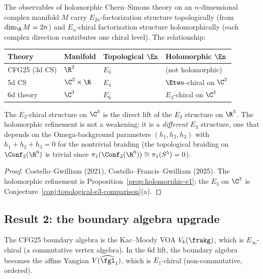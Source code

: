 \begin{proposition}
\label{prop:holomorphic-en-refinement}
The observables of holomorphic Chern--Simons theory on an $n$-dimensional complex manifold $M$ carry $E_{2n}$-factorization structure topologically (from $\dim_\R M = 2n$) and $E_n$-chiral factorization structure holomorphically (each complex direction contributes one chiral level). The relationship:
\begin{center}
\renewcommand{\arraystretch}{1.2}
\small
\begin{tabular}{llll}
 \toprule
 \textbf{Theory} & \textbf{Manifold} & \textbf{Topological $\En$} & \textbf{Holomorphic $\En$} \\
 \midrule
 CFG25 (3d CS) & $\R^3$ & $E_3$ & (not holomorphic) \\
 5d CS & $\C^2 \times \R$ & $E_4$ & $\Etwo$-chiral on $\C^2$ \\
 6d theory & $\C^3$ & $E_6$ & $E_3$-chiral on $\C^3$ \\
 \bottomrule
\end{tabular}
\end{center}
\noindent The $E_3$-chiral structure on $\C^3$ is the direct lift of the $E_3$ structure on $\R^3$. The holomorphic refinement is not a weakening: it is a \emph{different} $E_3$ structure, one that depends on the Omega-background parameters $(h_1, h_2, h_3)$ with $h_1 + h_2 + h_3 = 0$ for the nontrivial braiding (the topological braiding on $\Conf_2(\R^6)$ is trivial since $\pi_1(\Conf_2(\R^6)) \cong \pi_1(S^5) = 0$).
\end{proposition}

\begin{proof}
Costello--Gwilliam (2021), Costello--Francis--Gwilliam (2025). The holomorphic refinement is Proposition~\ref{prop:holomorphic-e1}; the $E_3$ on $\C^3$ is Conjecture~\ref{conj:topological-e3-comparison}(a).
\end{proof}

\subsection{Result 2: the boundary algebra upgrade}
\label{subsec:cfg25-result2}

The CFG25 boundary algebra is the Kac--Moody VOA $V_k(\frakg)$, which is $E_\infty$-chiral (a commutative vertex algebra). In the 6d lift, the boundary algebra becomes the affine Yangian $Y(\widehat{\fgl}_1)$, which is $E_1$-chiral (non-commutative, ordered).

